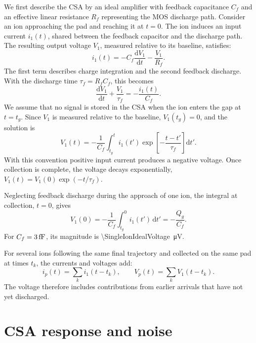 \documentclass[11pt,a4paper]{article}
\newcommand{\dd}{\mathrm{d}}
\begin{document}
We first describe the CSA by an ideal amplifier with feedback capacitance $C_f$ and an effective linear resistance $R_f$ representing the MOS discharge path. Consider an ion approaching the pad and reaching it at $t=0$.  The ion induces an input current $i_1(t)$, shared between the feedback capacitor and the discharge path. The resulting output voltage $V_1$, measured relative to its baseline, satisfies:
\begin{equation}
 i_1(t)=-C_f\frac{\dd V_1}{\dd t}-\frac{V_1}{R_f}.
 \label{eq:csa_current_balance}
\end{equation}
The first term describes charge integration and the second feedback discharge. With the discharge time $\tau_f=R_fC_f$, this becomes
%
\begin{equation}
 \frac{\dd V_1}{\dd t}+\frac{V_1}{\tau_f}
 =-\frac{i_1(t)}{C_f}.
 \label{eq:csa_ode}
\end{equation}
%
We assume that no signal is stored in the CSA when the ion enters the gap at $t=t_g$. Since $V_1$ is measured relative to the baseline, $V_1(t_g)=0$, and the solution is
\begin{equation}
 V_1(t)=-\frac{1}{C_f}\int_{t_g}^{t}
 i_1(t')\exp\left[-\frac{t-t'}{\tau_f}\right]\dd t'.
 \label{eq:csa_solution}
\end{equation}
With this convention positive input current produces a negative voltage. Once collection is complete, the voltage decays exponentially, $V_1(t)=V_1(0)\exp(-t/\tau_f)$.

Neglecting feedback discharge during the approach of one ion, the integral
at collection, $t=0$, gives
\[
 V_1(0)=-\frac{1}{C_f}\int_{t_g}^{0}i_1(t')\,\dd t'
 =-\frac{Q_g}{C_f}.
\]
For $C_f=\SI{3}{fF}$, its magnitude is
\SI{\SingleIonIdealVoltage}{\micro\volt}.

For several ions following the same final trajectory and collected on the
same pad at times $t_k$, the currents and voltages add:
\begin{equation}
 i_p(t)=\sum_k i_1(t-t_k),\qquad
 V_p(t)=\sum_k V_1(t-t_k).
 \label{eq:pad_superposition}
\end{equation}
The voltage therefore includes contributions from earlier arrivals that
have not yet discharged.


\section{CSA response and noise}
\label{sec:realistic_csa}
\end{document}
